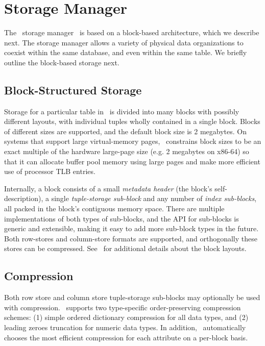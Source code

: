 
\section{Storage Manager} \label{storage-manager}

The \Quickstep\ storage manager~\cite{quickstep-storage} is based on a  block-based architecture, which we describe next. The storage manager allows a variety of physical data organizations to coexist within the same database, and even within the same table. We briefly outline the block-based storage next.

\subsection{Block-Structured Storage} \label{block-structure}
Storage for a particular table in \Quickstep\ is divided into many blocks with possibly different layouts, with individual tuples wholly contained in a single block. Blocks of different sizes are supported, and the default block size is 2 megabytes. On systems that support large virtual-memory pages, \Quickstep\ constrains block sizes to be an exact multiple of the hardware large-page size (e.g. 2 megabytes on x86-64) so that it can allocate buffer pool memory using large pages and make more efficient use of processor TLB entries.

Internally, a block consists of a small \textit{metadata header} (the block's self-description), a single \textit{tuple-storage sub-block} and any number of \textit{index sub-blocks}, all packed in the block's contiguous memory space. There are multiple implementations of both types of sub-blocks, and the API for sub-blocks is generic and extensible, making it easy to add more sub-block types in the future. Both row-stores and column-store formats are supported, and orthogonally these stores can be compressed. See~\cite{storage-blog-post} for additional details about the block layouts.


\subsection{Compression} \label{sec-compression}
Both row store and column store tuple-storage sub-blocks may optionally be used with compression. \Quickstep\ supports two type-specific order-preserving compression schemes: (1) simple ordered dictionary compression for all data types, and (2) leading zeroes truncation for numeric data types. In addition, \Quickstep\ automatically chooses the most efficient compression for each attribute on a per-block basis.

